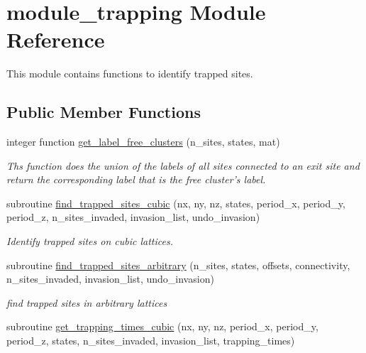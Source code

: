 \hypertarget{classmodule__trapping}{
\section{module\-\_\-trapping \-Module \-Reference}
\label{classmodule__trapping}
}


\-This module contains functions to identify trapped sites.  


\subsection*{\-Public \-Member \-Functions}
\begin{DoxyCompactItemize}
\item 
integer function \hyperlink{classmodule__trapping_acc4be246fb79d0cc00ed4f436feabd21}{get\-\_\-label\-\_\-free\-\_\-clusters} (n\-\_\-sites, states, mat)
\begin{DoxyCompactList}\small\item\em \-Ths function does the union of the labels of all sites connected to an exit site and return the corresponding label that is the free cluster's label. \end{DoxyCompactList}\item 
subroutine \hyperlink{classmodule__trapping_a15f5caceb776482e66d04fad11d9b5b1}{find\-\_\-trapped\-\_\-sites\-\_\-cubic} (nx, ny, nz, states, period\-\_\-x, period\-\_\-y, period\-\_\-z, n\-\_\-sites\-\_\-invaded, invasion\-\_\-list, undo\-\_\-invasion)
\begin{DoxyCompactList}\small\item\em \-Identify trapped sites on cubic lattices. \end{DoxyCompactList}\item 
subroutine \hyperlink{classmodule__trapping_ae74b46d92d3e8dfd116fa288aa279107}{find\-\_\-trapped\-\_\-sites\-\_\-arbitrary} (n\-\_\-sites, states, offsets, connectivity, n\-\_\-sites\-\_\-invaded, invasion\-\_\-list, undo\-\_\-invasion)
\begin{DoxyCompactList}\small\item\em find trapped sites in arbitrary lattices \end{DoxyCompactList}\item 
subroutine \hyperlink{classmodule__trapping_ac68c2a85f2c927eff8877a721a977aa8}{get\-\_\-trapping\-\_\-times\-\_\-cubic} (nx, ny, nz, period\-\_\-x, period\-\_\-y, period\-\_\-z, states, n\-\_\-sites\-\_\-invaded, invasion\-\_\-list, trapping\-\_\-times)

\end{DoxyCompactItemize}
